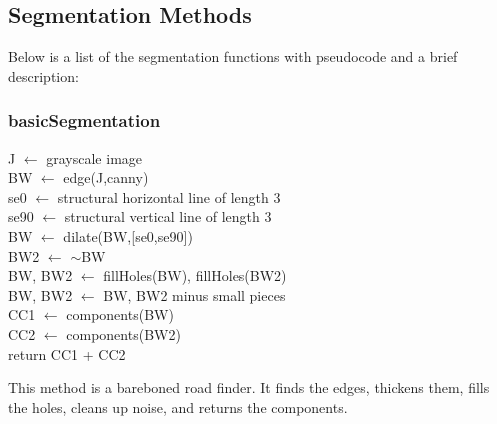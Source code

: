 \documentclass[12pt]{article}
\begin{document}
\subsection*{Segmentation Methods}

Below is a list of the segmentation functions with pseudocode and a brief description:


\subsubsection*{basicSegmentation}
\begin{addmargin}[12em]{1em}
	J $\leftarrow$ grayscale image \\
	BW $\leftarrow$ edge(J,canny) \\
	se0 $\leftarrow$ structural horizontal line of length 3 \\
	se90 $\leftarrow$ structural vertical line of length 3 \\
	BW $\leftarrow$ dilate(BW,[se0,se90]) \\
	BW2 $\leftarrow$ $\sim$BW \\
	BW, BW2 $\leftarrow$ fillHoles(BW), fillHoles(BW2)\\
	BW, BW2 $\leftarrow$ BW, BW2 minus small pieces \\
	CC1 $\leftarrow$ components(BW) \\
	CC2 $\leftarrow$ components(BW2) \\
	return CC1 + CC2 \\	
\end{addmargin}
This method is a bareboned road finder. It finds the edges, thickens them, fills the holes, cleans up noise, and returns the components.
\end{document}
